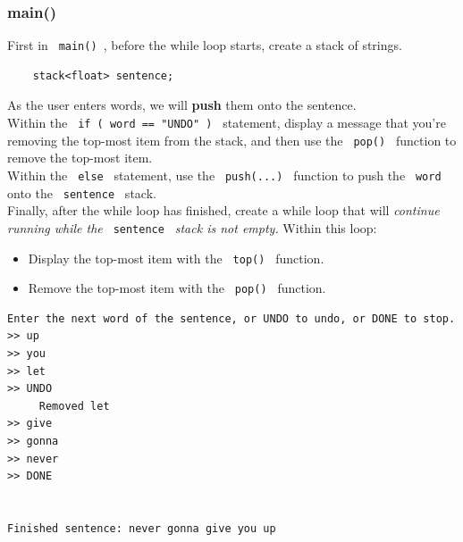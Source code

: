 \documentclass[a4paper,12pt]{book}
\begin{document}
            
                \hrulefill{}
                \subsubsection*{ main() }

                    First in \texttt{ main() }, before the while loop starts,
                    create a stack of strings.
                    
\begin{verbatim}
    stack<float> sentence;
\end{verbatim}

                    As the user enters words, we will \textbf{ push } them
                    onto the sentence. \\

                    Within the \texttt{ if ( word == "UNDO" ) } statement,
                    display a message that you're removing the top-most item
                    from the stack, and then use the \texttt{ pop() } function
                    to remove the top-most item. \\

                    Within the \texttt{ else } statement,
                    use the \texttt{ push(...) } function to push the
                    \texttt{ word } onto the \texttt{ sentence } stack. \\

                    Finally, after the while loop has finished, create
                    a while loop that will \textit{ continue running while
                    the } \texttt{ sentence } \textit { stack is not empty. }
                    Within this loop:

                    \begin{itemize}
                        \item Display the top-most item with the \texttt{ top() } function.
                        \item Remove the top-most item with the \texttt{ pop() } function.
                    \end{itemize}

\begin{lstlisting}[style=output]
Enter the next word of the sentence, or UNDO to undo, or DONE to stop.
>> up
>> you
>> let
>> UNDO
	 Removed let
>> give
>> gonna
>> never
>> DONE


Finished sentence: never gonna give you up 
\end{lstlisting}
            
\end{document}
